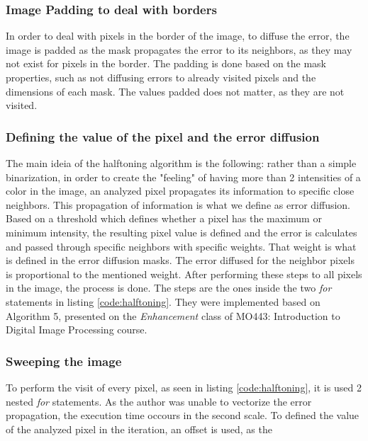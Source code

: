 \documentclass[]{IEEEtran}
\begin{document}
\subsubsection{Image Padding to deal with borders}
In order to deal with pixels in the border of the image, to diffuse the error, the image is padded as the mask propagates the error to its neighbors, as they may not exist for pixels in the border. The padding is done based on the mask properties, such as not diffusing errors to already visited pixels and the dimensions of each mask. The values padded does not matter, as they are not visited.

\subsubsection{Defining the value of the pixel and the error diffusion}
The main ideia of the halftoning algorithm is the following: rather than a simple binarization, in order to create the "feeling" of having more than 2 intensities of a color in the image, an analyzed pixel propagates its information to specific close neighbors. This propagation of information is what we define as error diffusion. Based on a threshold which defines whether a pixel has the maximum or minimum intensity, the resulting pixel value is defined and the error is calculates and passed through specific neighbors with specific weights. That weight is what is defined in the error diffusion masks. The error diffused for the neighbor pixels is proportional to the mentioned weight. After performing these steps to all pixels in the image, the process is done. The steps are the ones inside the two \textit{for} statements in listing \ref{code:halftoning}. They were implemented based on Algorithm 5, presented on the \textit{Enhancement} class of MO443: Introduction to Digital Image Processing course.  

\subsubsection{Sweeping the image}
To perform the visit of every pixel, as seen in listing \ref{code:halftoning}, it is used 2 nested \textit{for} statements. As the author was unable to vectorize the error propagation, the execution time occours in the second scale. To defined the value of the analyzed pixel in the iteration, an  offset is used, as the 

\end{document}
